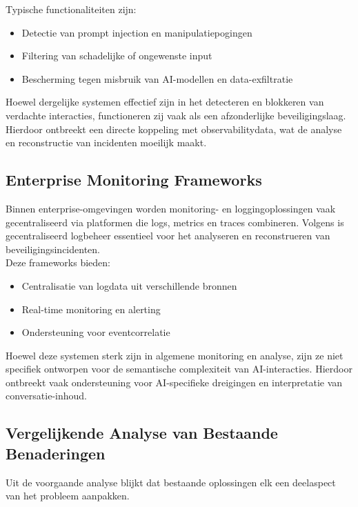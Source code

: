 Typische functionaliteiten zijn:

\begin{itemize}
    \item Detectie van prompt injection en manipulatiepogingen
    \item Filtering van schadelijke of ongewenste input
    \item Bescherming tegen misbruik van AI-modellen en data-exfiltratie
\end{itemize}

Hoewel dergelijke systemen effectief zijn in het detecteren en blokkeren van verdachte interacties, functioneren zij vaak als een afzonderlijke beveiligingslaag. Hierdoor ontbreekt een directe koppeling met observabilitydata, wat de analyse en reconstructie van incidenten moeilijk maakt.

\subsection{Enterprise Monitoring Frameworks}

Binnen enterprise-omgevingen worden monitoring- en loggingoplossingen vaak gecentraliseerd via platformen die logs, metrics en traces combineren. Volgens \textcite{nist80092} is gecentraliseerd logbeheer essentieel voor het analyseren en reconstrueren van beveiligingsincidenten.\\

Deze frameworks bieden:

\begin{itemize}
    \item Centralisatie van logdata uit verschillende bronnen
    \item Real-time monitoring en alerting
    \item Ondersteuning voor eventcorrelatie
\end{itemize}

Hoewel deze systemen sterk zijn in algemene monitoring en analyse, zijn ze niet specifiek ontworpen voor de semantische complexiteit van AI-interacties. Hierdoor ontbreekt vaak ondersteuning voor AI-specifieke dreigingen en interpretatie van conversatie-inhoud.

\subsection{Vergelijkende Analyse van Bestaande Benaderingen}

Uit de voorgaande analyse blijkt dat bestaande oplossingen elk een deelaspect van het probleem aanpakken.\\

